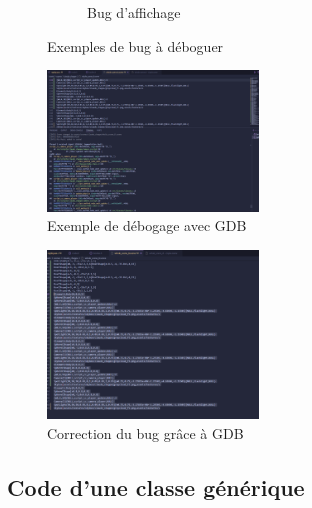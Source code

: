 \begin{figure}[H]
\begin{subfigure}{0.5\textwidth}
        \caption{Bug d'affichage}
        \label{fig:editeur3}
    \end{subfigure}
    \caption{Exemples de bug à déboguer}
    \label{fig:debug}
\end{figure}

\begin{multicols}{2}
\begin{figure}[H]
    \centering
    \includegraphics[width=0.5\textwidth]{images/gdb.png}
    \caption{Exemple de débogage avec GDB}
    \label{fig:debug}
\end{figure}

\begin{figure}[H]
    \centering
    \includegraphics[width=0.5\textwidth]{images/gdb_fix.png}
    \caption{Correction du bug grâce à GDB}
    \label{fig:fix}
\end{figure}
\end{multicols}

\subsection{Code d'une classe générique}

